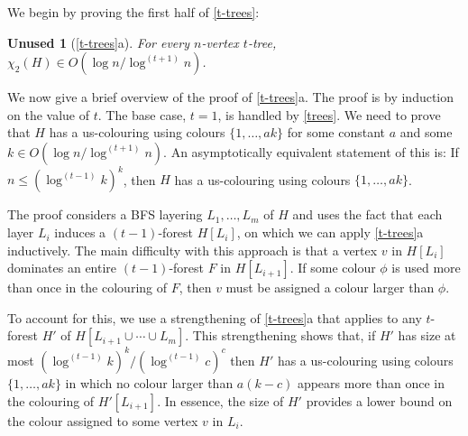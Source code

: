 \documentclass[kpfonts]{patmorin}
\newcommand{\uqs}{\chi_2}
\theoremstyle{named}
\newtheorem*{namedtheorem}{Unused}
\newcommand{\weirdref}[2]{\cref{#1}#2}
\newcommand{\weirdlabel}[2]{\label{#1-#1}}
\begin{document}
We begin by proving the first half of \cref{t-trees}:

\begin{namedtheorem}[\weirdref{t-trees}{a}]\weirdlabel{t-trees}{a}
    For every $n$-vertex $t$-tree, $\uqs(H)\in O(\log n/\log^{(t+1)} n)$.
\end{namedtheorem}

We now give a brief overview of the proof of \weirdref{t-trees}{a}.  The proof is by induction on the value of $t$.  The base case, $t=1$, is handled by \cref{trees}.  We need to prove that $H$ has a us-colouring using colours $\{1,\ldots,ak\}$ for some constant $a$ and some $k\in O(\log n/\log^{(t+1)} n)$.  An asymptotically equivalent statement of this is: If $n \le (\log^{(t-1)}k)^k$, then $H$ has a us-colouring using colours $\{1,\ldots,ak\}$.

The proof considers a BFS layering $L_1,\ldots,L_m$ of $H$ and uses the fact that each layer $L_i$ induces a $(t-1)$-forest $H[L_i]$, on which we can apply \weirdref{t-trees}{a} inductively.  The main difficulty with this approach is that a vertex $v$ in $H[L_i]$ dominates an entire $(t-1)$-forest $F$ in $H[L_{i+1}]$.  If some colour $\phi$ is used more than once in the colouring of $F$, then $v$ must be assigned a colour larger than $\phi$.

To account for this, we use a strengthening of \weirdref{t-trees}{a} that applies to any $t$-forest $H'$ of $H[L_{i+1}\cup\cdots\cup L_m]$.  This strengthening shows that, if $H'$ has size at most $(\log^{(t-1)} k)^k/(\log^{(t-1)} c)^c$ then $H'$ has a us-colouring using colours $\{1,\ldots,ak\}$ in which no colour larger than $a(k-c)$ appears more than once in the colouring of $H'[L_{i+1}]$.  In essence, the size of $H'$ provides a lower bound on the colour assigned to some vertex $v$ in $L_i$.
\end{document}
